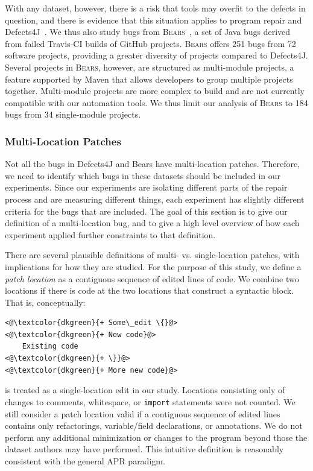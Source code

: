\documentclass[10pt,journal,compsoc]{IEEEtran}
\newcommand\bears{\textsc{Bears}\xspace}
\begin{document}
With any dataset, however, there is a risk that tools may overfit
to the defects in question, and there is evidence that this situation applies to
program repair and Defects4J~\cite{durieux-repair-them-all}. 
We thus also study bugs from \bears~\cite{bears}, 
a set of Java bugs derived from failed Travis-CI builds of GitHub projects. 
\bears offers 251 bugs from 72 software projects, providing a greater diversity of 
projects compared to Defects4J. 
Several projects in \bears, however, are structured as multi-module projects, a feature 
supported by Maven that allows developers to group multiple projects together. Multi-module 
projects are more complex to build and are not currently compatible with our automation tools.
We thus limit our analysis of \bears to 184 bugs from 34 single-module projects.

\subsubsection{Multi-Location Patches}

Not all the bugs in Defects4J and Bears have multi-location patches. 
Therefore, we need to identify which bugs in these datasets should be included in our experiments.
Since our experiments are isolating different parts of the repair process and are measuring different things, 
each experiment has slightly different criteria for the bugs that are included.
The goal of this section is to give our definition of a multi-location bug, and to give a high level overview 
of how each experiment applied further constraints to that definition.

There are several plausible definitions of multi- vs. single-location patches, with
implications for how they are studied. For the purpose of this study, we define
a \emph{patch location} as a contiguous sequence of edited lines of code.  We
combine two locations if there is code at the two locations that construct a syntactic 
block. That is, conceptually:
\begin{lstlisting}[style=examplestyle]
<@\textcolor{dkgreen}{+ Some\_edit \{}@>
<@\textcolor{dkgreen}{+ New code}@>
    Existing code
<@\textcolor{dkgreen}{+ \}}@>
<@\textcolor{dkgreen}{+ More new code}@>
\end{lstlisting}
is treated as a single-location edit in our study. Locations consisting only of changes to
comments, whitespace, or \texttt{import} statements were not counted.
We still consider a patch location valid if a contiguous sequence of edited lines contains 
only refactorings, variable/field declarations, or annotations. We do not perform any 
additional minimization or changes to the program beyond those the dataset authors may 
have performed.
This intuitive definition is reasonably consistent with the general APR
paradigm. 
\end{document}
